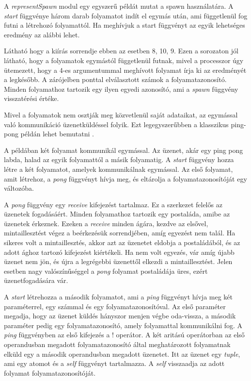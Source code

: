 A \textit{representSpawn} modul egy egyszerű példát mutat a spawn használatára. A \textit{start} függvénye három darab folyamatot indít el egymás után, ami függetlenül fog futni a létrehozó folyamattól. Ha meghívjuk a start függvényt az egyik lehetséges eredmény az alábbi lehet.



Látható hogy a kiírás sorrendje ebben az esetben 8, 10, 9. Ezen a sorozaton jól látható, hogy a folyamatok egymástól függetlenül futnak, mivel a processzor úgy ütemezett, hogy a 4-es argumentummal meghívott folyamat írja ki az eredményét a legkésőbb. A zárójelben ponttal elválasztott számok a folyamatazonosító. Minden folyamathoz tartozik egy ilyen egyedi azonosító, ami a \textit{spawn} függvény visszatérési értéke.

Mivel a folyamatok nem osztják meg közvetlenül saját adataikat, az egymással való kommunikáció üzenetküldéssel folyik. Ezt legegyszerűbben a klasszikus ping-pong példán lehet bemutatni \cite{RefMan}.



A példában két folyamat kommunikál egymással. Az üzenet, akár egy ping pong labda, halad az egyik folyamattól a másik folyamatig. A \textit{start} függvény hozza létre a két folyamatot, amelyek kommunikálnak egymással. Az első folyamat, amit létrehoz, a \textit{pong} függvényt hívja meg, és eltárolja a folyamatazonosítóját egy változóba.

A \textit{pong} függvény egy \textit{receive} kifejezést tartalmaz. Ez a szerkezet felelős az üzenetek fogadásáért. Minden folyamathoz tartozik egy postaláda, amibe az üzenetek érkeznek. Ezeken a \textit{receive} minden ágára, kezdve az elsővel, mintaillesztést végez a beérkezésük sorrendjében, amíg egyezést nem talál. Ha sikeres volt a mintaillesztés, akkor azt az üzenetet eldobja a postaládából, és az adott ághoz tartozó kifejezést kiértékeli. Ha nem volt egyezés, vár amíg újabb üzenet nem jön, és újra a legrégebbi üzenettől elkezdi a mintaillesztést. Jelen esetben nagy valószínűséggel a \textit{pong} folyamat postaládája üres, ezért üzenetfogadására vár.

A \textit{start} létrehozza a második folyamatot, ami a \textit{ping} függvényt hívja meg két paraméterrel, egy számmal és egy folyamatazonosítóval. Az első paraméter megadja, hogy az üzenet küldés hányszor menjen végbe oda-vissza, a második paraméter pedig egy folyamatazonosító, amely folyamattal kommunikálni fog. A \textit{ping} függvényben az első kifejezés a ! operátor. A két aritású operátorban az első operandusban megadott folyamatazonosító által meghatározott folyamatnak elküld egy a második operandusban megadott üzenetet. Itt az üzenet egy \textit{tuple}, ami egy atomot és a \textit{self} függvényt tartalmazza. A \textit{self} visszaadja az adott folyamat folyamatazonosítóját.

